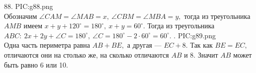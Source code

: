 88. {{PIC:g88.png}}\\
Обозначим $\angle CAM=\angle MAB=x,\ \angle CBM=\angle MBA=y,$ тогда из треугольника $AMB$ имеем $x+y+120^\circ=180^\circ,\ x+y=60^\circ.$ Тогда из треугольника $ABC:\ 2x+2y+\angle C=180^\circ,\ \angle C=180^\circ-2\cdot60^\circ=60^\circ.$\newpage
{}. {{PIC:g89.png}}\\
Одна часть периметра равна $AB+BE,$ а другая --- $EC+8.$ Так как $BE=EC,$ отличаются они на столько же, на сколько отличаются $AB$ и 8. Значит $AB$ может быть равно 6 или 10.\\
